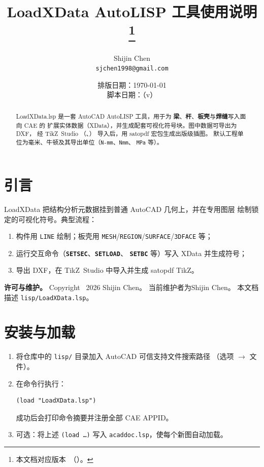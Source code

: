 \documentclass[a4paper]{ltxdoc}
\title{%
  \textsf{LoadXData} AutoLISP 工具使用说明%
  \thanks{本文档对应版本~\fileversion{}（\filedate）。}%
}
\author{%
  Shijin Chen\\
  \texttt{sjchen1998@gmail.com}%
}
\date{排版日期：\today\\[0.5em] 脚本日期：\filedate{}（v\fileversion）}
\newcommand{\cadcmd}[1]{\texttt{\textbf{#1}}}
\begin{document}
\maketitle

\begin{abstract}
\textsf{LoadXData.lsp} 是一套 AutoCAD AutoLISP 工具，用于为
\textbf{梁}、\textbf{杆}、\textbf{板壳}与\textbf{焊缝}写入面向 CAE 的
扩展实体数据（XData），并生成配套可视化符号块。图中数据可导出为 DXF，
经 TikZ~Studio
（、）
导入后，用 \textsf{satopdf} 宏包生成出版级插图。
默认工程单位为毫米、牛顿及其导出单位（\texttt{N-mm}、\texttt{Nmm}、
\texttt{MPa} 等）。
\end{abstract}

\tableofcontents
\clearpage

\section{引言}

\textsf{LoadXData} 把结构分析元数据挂到普通 AutoCAD 几何上，并在专用图层
绘制锁定的可视化符号。典型流程：

\begin{enumerate}[nosep]
  \item 构件用 \texttt{LINE} 绘制；板壳用
        \texttt{MESH}/\texttt{REGION}/\texttt{SURFACE}/\texttt{3DFACE} 等；
  \item 运行交互命令（\cadcmd{SETSEC}、\cadcmd{SETLOAD}、
        \cadcmd{SETBC} 等）写入 XData 并生成符号；
  \item 导出 DXF，在 TikZ~Studio 中导入并生成 \textsf{satopdf} TikZ。
\end{enumerate}

\noindent\textbf{许可与维护。}
Copyright \textcopyright\ 2026 Shijin Chen。
当前维护者为Shijin Chen。
本文档描述 \texttt{lisp/LoadXData.lsp}。

\section{安装与加载}

\begin{enumerate}[nosep]
  \item 将仓库中的 \texttt{lisp/} 目录加入 AutoCAD 可信支持文件搜索路径
        （选项 $\rightarrow$ 文件）。
  \item 在命令行执行：
\begin{verbatim}
(load "LoadXData.lsp")
\end{verbatim}
        成功后会打印命令摘要并注册全部 CAE APPID。
  \item 可选：将上述 \texttt{(load \ldots)} 写入
        \texttt{acaddoc.lsp}，使每个新图自动加载。
\end{enumerate}
\end{document}
